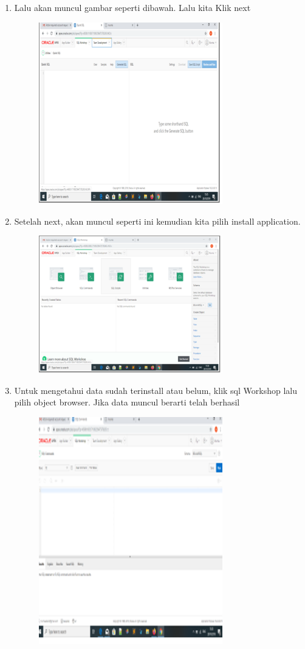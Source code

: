 \documentclass{article}
\begin{document}
\begin{enumerate}
\begin{figure}[h]
            \end{figure}
    \item	Lalu akan muncul gambar seperti dibawah. Lalu kita Klik next
    \begin{figure}[h]
            \centerline{\includegraphics[width=8cm]{image/4.png}}
            \end{figure}
    \item Setelah next, akan muncul seperti ini kemudian kita pilih install application.
    \begin{figure}[h]
            \centerline{\includegraphics[width=8cm]{image/5.PNG}}
            \end{figure}
    \newpage \item Untuk mengetahui data sudah terinstall atau belum, klik sql Workshop lalu pilih object browser. Jika data muncul berarti telah berhasil
    \begin{figure}[h]
            \centerline{\includegraphics[width=8cm]{image/6.png}}

\end{figure}
\end{enumerate}
\end{document}
